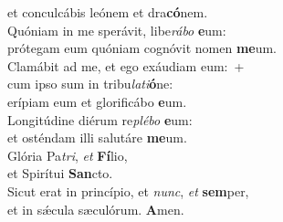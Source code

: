 \oddverse et conculcábis leónem et dra\textbf{có}nem.\\
\evenverse Quóniam in me sperávit, libe\textit{rá}\textit{bo} \textbf{e}um:~\*\\
\evenverse prótegam eum quóniam cognóvit nomen \textbf{me}um.\\
\oddverse Clamábit ad me, et ego exáudiam eum:~+\\
\oddverse  cum ipso sum in tribu\textit{la}\textit{ti}\textbf{ó}ne:~\*\\
\oddverse erípiam eum et glorificábo \textbf{e}um.\\
\evenverse Longitúdine diérum re\textit{plé}\textit{bo} \textbf{e}um:~\*\\
\evenverse et osténdam illi salutáre \textbf{me}um.\\
\oddverse Glória Pa\textit{tri}, \textit{et} \textbf{Fí}lio,~\*\\
\oddverse et Spirítui \textbf{San}cto.\\
\evenverse Sicut erat in princípio, et \textit{nunc}, \textit{et} \textbf{sem}per,~\*\\
\evenverse et in sǽcula sæculórum. \textbf{A}men.\\
